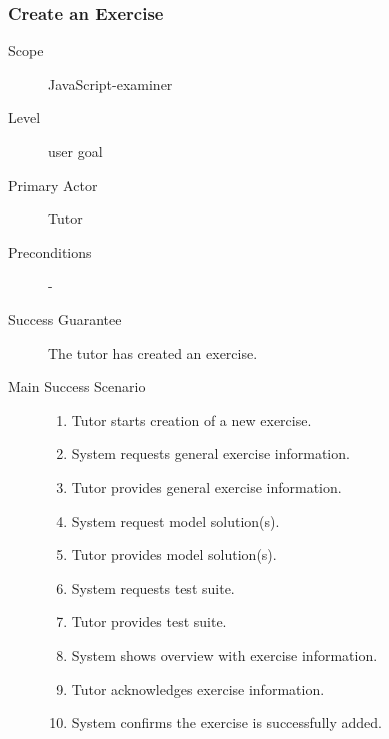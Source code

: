 \subsubsection{Create an Exercise}
\begin{mdframed} [rightmargin=-100pt]
\begin{description}
  \item[Scope] JavaScript-examiner
  \item[Level] user goal
  \item[Primary Actor] Tutor
  \item[Preconditions] -
  \item[Success Guarantee] The tutor has created an exercise.
  \item[Main Success Scenario] \mbox{}
	\begin{enumerate}
	  \item Tutor starts creation of a new exercise.
	  \item System requests general exercise information.
	  \item Tutor provides general exercise information.
    \item System request model solution(s).
    \item Tutor provides model solution(s).
    \item System requests test suite.
    \item Tutor provides test suite.
    \item System shows overview with exercise information.
    \item Tutor acknowledges exercise information.
    \item System confirms the exercise is successfully added.
	\end{enumerate}
\end{description}
\end{mdframed}

